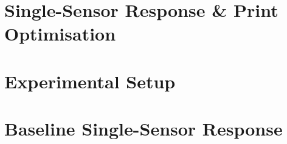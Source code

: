 \section{Single-Sensor Response \& Print Optimisation}\label{Sensor Structure & the Small-Strain Operating Point}


\section{Experimental Setup}\label{Experimental Setup}


\section{Baseline Single-Sensor Response}\label{Baseline Single-Sensor Response}


